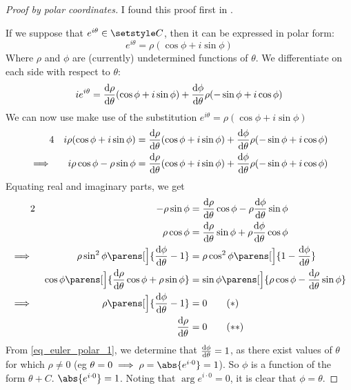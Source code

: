 \begin{proof}[Proof by polar coordinates]
 I found this proof first in \cite{WikiEulersFormula}.

 If we suppose that \(e^{i \theta} \in \Complex\), then it can be expressed in
 polar form:
 \begin{equation*}
  e^{i \theta} = \rho (\cos \phi + i \sin \phi)
 \end{equation*}
 Where \(\rho\) and \(\phi\) are (currently) undetermined functions of
 \(\theta\). We differentiate on each side with respect to \(\theta\):
 \begin{equation*}
  i e^{i \theta} = \dv<\rho>{\theta} (\cos \phi + i \sin \phi)
                 + \dv<\phi>{\theta} \rho (-\sin \phi + i \cos \phi)
 \end{equation*}
 We can now use make use of the substitution
 \(e^{i \theta} = \rho (\cos \phi + i \sin \phi)\)
 \begin{alignat*}4
  && i \rho (\cos \phi + i \sin \phi) &=
                   \dv<\rho>{\theta} (\cos \phi + i \sin \phi)
                 + \dv<\phi>{\theta} \rho (-\sin \phi + i \cos \phi) \\
  \implies{}&& i \rho \cos \phi - \rho \sin \phi &=
                   \dv<\rho>{\theta} (\cos \phi + i \sin \phi)
                 + \dv<\phi>{\theta} \rho (-\sin \phi + i \cos \phi)
 \end{alignat*}
 Equating real and imaginary parts, we get
 \begin{alignat*}2
  && -\rho \sin \phi &= \dv<\rho>{\theta} \cos \phi
                      - \rho \dv<\phi>{\theta} \sin \phi \\
  && \rho \cos \phi &= \dv<\rho>{\theta} \sin \phi
                     + \rho \dv<\phi>{\theta} \cos \phi \\
  \implies{}&& \rho \sin^2 \phi \parens[\Big]{\dv<\phi>{\theta} - 1} &=
               \rho \cos^2 \phi \parens[\Big]{1 - \dv<\phi>{\theta}} \\
  && \cos \phi \parens[\Big]{\dv<\rho>{\theta} \cos \phi + \rho \sin \phi} &=
     \sin \phi \parens[\Big]{\rho \cos \phi - \dv<\rho>{\theta} \sin \phi} \\
  \implies{}&& \rho \parens[\Big]{\dv<\phi>{\theta} - 1} &= 0
   \tag{\(\ast\)} \label{eq_euler_polar_1} \\
  && \dv<\rho>{\theta} &= 0
   \tag{\(\ast\ast\)} \label{eq_euler_polar_2}
 \end{alignat*}
 From \ref{eq_euler_polar_1}, we determine that \(\dv<\phi>{\theta} = 1\), as
 there exist values of \(\theta\) for which \(\rho \ne 0\)
 (eg \(\theta = 0 \implies \rho = \abs{e^{i \cdot 0}} = 1\)). So \(\phi\) is a
 function of the form \(\theta + C\).
 \(\abs{e^{i \cdot 0}} = 1\). Noting that \(\arg e^{i \cdot 0} = 0\), it is
 clear that \(\phi = \theta\).


\end{proof}
